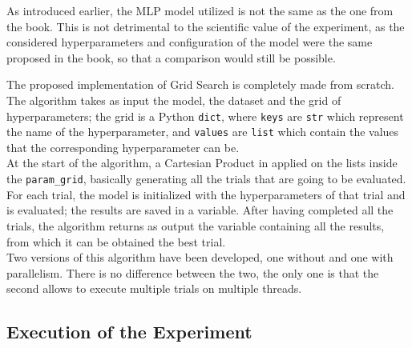 As introduced earlier, the MLP model utilized is not the same as the one from the book. This is not detrimental to the scientific value of the experiment, as the considered hyperparameters and configuration of the model were the same proposed in the book, so that a comparison would still be possible.

The proposed implementation of Grid Search is completely made from scratch.
The algorithm takes as input the model, the dataset and the grid of hyperparameters; the grid is a Python \texttt{dict}, where \texttt{keys} are \texttt{str} which represent the name of the hyperparameter, and \texttt{values} are \texttt{list} which contain the values that the corresponding hyperparameter can be.
\\[0.3cm]At the start of the algorithm, a Cartesian Product in applied on the lists inside the \texttt{param\_grid}, basically generating all the trials that are going to be evaluated.
For each trial, the model is initialized with the hyperparameters of that trial and is evaluated; the results are saved in a variable.
After having completed all the trials, the algorithm returns as output the variable containing all the results, from which it can be obtained the best trial.
\\[0.3cm]Two versions of this algorithm have been developed, one without and one with parallelism. There is no difference between the two, the only one is that the second allows to execute multiple trials on multiple threads.

\subsection{Execution of the Experiment}

